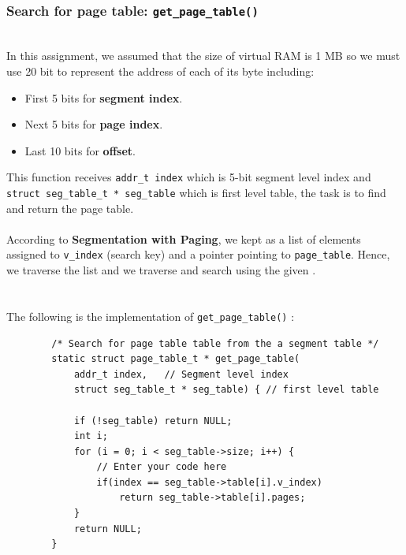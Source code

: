 \documentclass[a4paper]{article}
\begin{document}
	\subsubsection{Search for page table: \texttt{get\_page\_table()}}
	\hfill \\
	In this assignment, we assumed that the size of virtual RAM is 1 MB so we must use 20 bit to represent the address of each of its byte including:\\
	\begin{itemize}
	    \item First 5 bits for {\bfseries segment index}.
	    \item Next 5 bits for {\bfseries page index}.
	    \item Last 10 bits for {\bfseries offset}.
	\end{itemize}
	This function receives \texttt{addr\_t index} which is 5-bit segment level index and  \texttt{struct seg\_table\_t * seg\_table} which is first level table, the task is to find and return the page table.\\
	\\
	According to \textbf{Segmentation with Paging}, we kept  as a list of elements assigned to \texttt{v\_index} (search key) and a pointer pointing to \texttt{page\_table}. Hence, we traverse the list and we traverse and search using the given .\\
	\\
	\\
	The following is the implementation of \texttt{get\_page\_table()} : \\
	\begin{lstlisting}
    	/* Search for page table table from the a segment table */
        static struct page_table_t * get_page_table(
    		addr_t index, 	// Segment level index
    		struct seg_table_t * seg_table) { // first level table
    	
    	    if (!seg_table) return NULL;
    	    int i;
    	    for (i = 0; i < seg_table->size; i++) {
    		    // Enter your code here
    		    if(index == seg_table->table[i].v_index) 
    		        return seg_table->table[i].pages;
    	    }
    	    return NULL;
        }
	\end{lstlisting}
\end{document}

